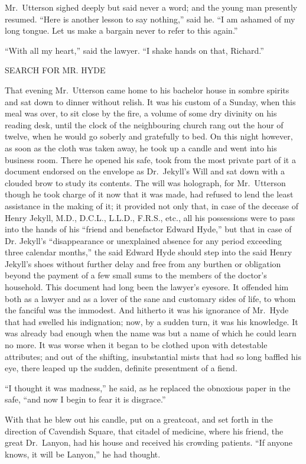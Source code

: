 \documentclass[12pt,openright]{book}
\begin{document}
Mr. Utterson sighed deeply but said never a word; and the young man presently resumed. “Here is another lesson to say nothing,” said he. “I am ashamed of my long tongue. Let us make a bargain never to refer to this again.”

“With all my heart,” said the lawyer. “I shake hands on that, Richard.”

SEARCH FOR MR. HYDE

That evening Mr. Utterson came home to his bachelor house in sombre spirits and sat down to dinner without relish. It was his custom of a Sunday, when this meal was over, to sit close by the fire, a volume of some dry divinity on his reading desk, until the clock of the neighbouring church rang out the hour of twelve, when he would go soberly and gratefully to bed. On this night however, as soon as the cloth was taken away, he took up a candle and went into his business room. There he opened his safe, took from the most private part of it a document endorsed on the envelope as Dr. Jekyll’s Will and sat down with a clouded brow to study its contents. The will was holograph, for Mr. Utterson though he took charge of it now that it was made, had refused to lend the least assistance in the making of it; it provided not only that, in case of the decease of Henry Jekyll, M.D., D.C.L., L.L.D., F.R.S., etc., all his possessions were to pass into the hands of his “friend and benefactor Edward Hyde,” but that in case of Dr. Jekyll’s “disappearance or unexplained absence for any period exceeding three calendar months,” the said Edward Hyde should step into the said Henry Jekyll’s shoes without further delay and free from any burthen or obligation beyond the payment of a few small sums to the members of the doctor’s household. This document had long been the lawyer’s eyesore. It offended him both as a lawyer and as a lover of the sane and customary sides of life, to whom the fanciful was the immodest. And hitherto it was his ignorance of Mr. Hyde that had swelled his indignation; now, by a sudden turn, it was his knowledge. It was already bad enough when the name was but a name of which he could learn no more. It was worse when it began to be clothed upon with detestable attributes; and out of the shifting, insubstantial mists that had so long baffled his eye, there leaped up the sudden, definite presentment of a fiend.

“I thought it was madness,” he said, as he replaced the obnoxious paper in the safe, “and now I begin to fear it is disgrace.”

With that he blew out his candle, put on a greatcoat, and set forth in the direction of Cavendish Square, that citadel of medicine, where his friend, the great Dr. Lanyon, had his house and received his crowding patients. “If anyone knows, it will be Lanyon,” he had thought.
\end{document}

